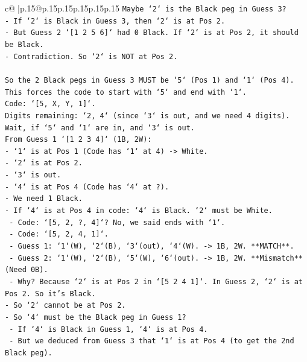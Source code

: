 \documentclass{article}
\begin{document}
{\begin{supertabular}{c@{$\;$}|p{.15\linewidth}@{}p{.15\linewidth}p{.15\linewidth}p{.15\linewidth}p{.15\linewidth}p{.15\linewidth}}
{{{\texttt{Maybe `2` is the Black peg in Guess 3?} \\
\texttt{{-} If `2` is Black in Guess 3, then `2` is at Pos 2.} \\
\texttt{{-} But Guess 2 `{[}1 2 5 6{]}` had 0 Black. If `2` is at Pos 2, it should be Black.} \\
\texttt{{-} Contradiction. So `2` is NOT at Pos 2.} \\
\\ 
\texttt{So the 2 Black pegs in Guess 3 MUST be `5` (Pos 1) and `1` (Pos 4).} \\
\texttt{This forces the code to start with `5` and end with `1`.} \\
\texttt{Code: `{[}5, X, Y, 1{]}`.} \\
\texttt{Digits remaining: `2, 4` (since `3` is out, and we need 4 digits).} \\
\texttt{Wait, if `5` and `1` are in, and `3` is out.} \\
\texttt{From Guess 1 `{[}1 2 3 4{]}` (1B, 2W):} \\
\texttt{{-} `1` is at Pos 1 (Code has `1` at 4) {-}> White.} \\
\texttt{{-} `2` is at Pos 2.} \\
\texttt{{-} `3` is out.} \\
\texttt{{-} `4` is at Pos 4 (Code has `4` at ?).} \\
\texttt{{-} We need 1 Black.} \\
\texttt{{-} If `4` is at Pos 4 in code: `4` is Black. `2` must be White.} \\
\texttt{    {-} Code: `{[}5, 2, ?, 4{]}`? No, we said ends with `1`.} \\
\texttt{    {-} Code: `{[}5, 2, 4, 1{]}`.} \\
\texttt{        {-} Guess 1: `1`(W), `2`(B), `3`(out), `4`(W). {-}> 1B, 2W. **MATCH**.} \\
\texttt{        {-} Guess 2: `1`(W), `2`(B), `5`(W), `6`(out). {-}> 1B, 2W. **Mismatch** (Need 0B).} \\
\texttt{        {-} Why? Because `2` is at Pos 2 in `{[}5 2 4 1{]}`. In Guess 2, `2` is at Pos 2. So it's Black.} \\
\texttt{{-} So `2` cannot be at Pos 2.} \\
\texttt{{-} So `4` must be the Black peg in Guess 1?} \\
\texttt{    {-} If `4` is Black in Guess 1, `4` is at Pos 4.} \\
\texttt{    {-} But we deduced from Guess 3 that `1` is at Pos 4 (to get the 2nd Black peg).} \\
}}}
\end{supertabular}}
\end{document}
